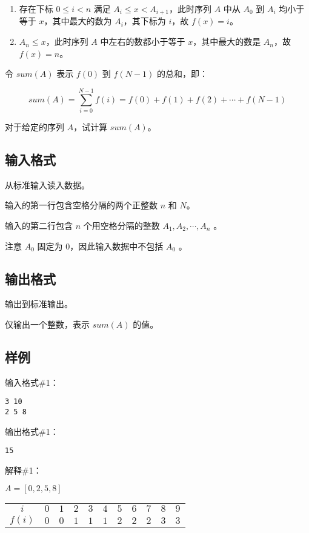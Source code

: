 \documentclass[cn,10pt,math=newtx,citestyle=gb7714-2015,bibstyle=gb7714-2015]{elegantbook}
\begin{document}
\begin{enumerate}
  \item 存在下标 $0\le i<n$ 满足 $A_i\le x < A_{i+1}$，此时序列 $A$ 中从 $A_0$ 到 $A_i$ 均小于等于 $x$，其中最大的数为 $A_i$，其下标为 $i$，故 $f(x)=i$。
  \item $A_n\le x$，此时序列 $A$ 中左右的数都小于等于 $x$，其中最大的数是 $A_n$，故 $f(x)=n$。
\end{enumerate}

令 $sum(A)$ 表示 $f(0)$ 到 $f(N-1)$ 的总和，即：

\begin{equation*}
sum(A) = \sum_{i=0}^{N-1} {f(i)=f(0)+f(1)+f(2)+\cdots +f(N-1)}
\end{equation*}

对于给定的序列 $A$，试计算 $sum(A)$。

\subsection*{输入格式}

从标准输入读入数据。

输入的第一行包含空格分隔的两个正整数 $n$ 和 $N$。

输入的第二行包含 $n$ 个用空格分隔的整数 $A_1,A_2,\cdots,A_n$
。

注意 $A_0$
 固定为 $0$，因此输入数据中不包括 $A_0$ 
。

\subsection*{输出格式}

输出到标准输出。

仅输出一个整数，表示 $sum(A)$ 的值。

\subsection*{样例}

输入格式\#1：

\begin{lstlisting}
3 10
2 5 8
\end{lstlisting}

输出格式\#1：

\begin{lstlisting}
15
\end{lstlisting}

解释\#1：

$A=[0, 2, 5, 8]$

\begin{table}[htbp]
  \centering
  \begin{tabular}{ccccccccccc}
    \toprule
    $i$ & $0$ & $1$ & $2$ & $3$ & $4$ & $5$ & $6$ & $7$ & $8$ & $9$ \\
    $f(i)$ & $0$ & $0$ & $1$ & $1$ & $1$ & $2$ & $2$ & $2$ & $3$ & $3$ \\
    \bottomrule
  \end{tabular}
\end{table}
\end{document}
